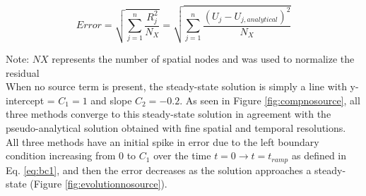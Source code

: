 \documentclass[10pt, letter, showtrims]{extarticle}
\begin{document}
		\begin{equation}
		\label{eq:L2Norm}
			Error = \sqrt{\sum_{j=1}^{n} \frac{R_{j}^{2}}{N_{X}}} = \sqrt{\sum_{j=1}^{n} \frac{(U_{j} - U_{j, analytical})^{2}}{N_{X}}}
		\end{equation}
		
		\noindent
		Note: $NX$ represents the number of spatial nodes and was used to normalize the residual \\
		
		
		\noindent
		When no source term is present, the steady-state solution is simply a line with y-intercept = $C_{1} = 1$ and slope $C_{2} = -0.2$. As seen in Figure \ref{fig:compnosource}, all three methods converge to this steady-state solution in agreement with the pseudo-analytical solution obtained with fine spatial and temporal resolutions. All three methods have an initial spike in error due to the left boundary condition increasing from $0$ to $C_{1}$ over the time $t = 0 \rightarrow t=t_{ramp}$ as defined in Eq. \ref{eq:bc1}, and then the error decreases as the solution approaches a steady-state (Figure \ref{fig:evolutionnosource}).
		
\end{document}
